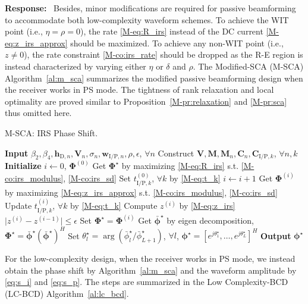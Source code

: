 \documentclass{article}
\newcounter{reviewer}
\newcounter{point}[reviewer]
\newcounter{response}[reviewer]
\newenvironment{response}
	{\refstepcounter{response} \medskip \noindent \textbf{Response:}\ }
	{\medskip}
\begin{document}
\begin{reviewer}
\begin{response}
			Besides, minor modifications are required for passive beamforming to accommodate both low-complexity waveform schemes. To achieve the WIT point (i.e., $\eta=\rho=0$), the rate \eqref{M-eq:R_irs} instead of the DC current \eqref{M-eq:z_irs_approx} should be maximized. To achieve any non-WIT point (i.e., $z \ne 0$), the rate constraint \eqref{M-co:irs_rate} should be dropped as the R-E region is instead characterized by varying either $\eta$ or $\delta$ and $\rho$. The Modified-SCA (M-SCA) Algorithm~\ref{al:m_sca} summarizes the modified passive beamforming design when the receiver works in PS mode. The tightness of rank relaxation and local optimality are proved similar to Proposition~\ref{M-pr:relaxation} and \ref{M-pr:sca} thus omitted here.
			\begin{algorithm}[!h]
				\caption{M-SCA: IRS Phase Shift.}
				\label{al:m_sca}
				\begin{algorithmic}[1]
					\State \textbf{Input} $\beta_2,\beta_4,\boldsymbol{h}_{\mathrm{D},n},\boldsymbol{V}_{n},\sigma_n,\boldsymbol{w}_{\mathrm{I/P},n},\rho,\epsilon$, $\forall n$
					\State Construct $\boldsymbol{V},\boldsymbol{M},\boldsymbol{M}_n,\boldsymbol{C}_{n},\boldsymbol{C}_{\mathrm{I/P},k}$, $\forall n,k$
					\State \textbf{Initialize} $i \gets 0$, $\boldsymbol{\Phi}^{(0)}$
						\State Get $\boldsymbol{\Phi}^{\star}$ by maximizing \eqref{M-eq:R_irs} s.t. \eqref{M-co:irs_modulus}, \eqref{M-co:irs_sd}
					\Else
						\State Set $t_{\mathrm{I/P},k}^{(0)}$, $\forall k$ by \eqref{M-eq:t_k}
						\Repeat
							\State $i \gets i + 1$
								\State Get $\boldsymbol{\Phi}^{(i)}$ by maximizing \eqref{M-eq:z_irs_approx} s.t. \eqref{M-co:irs_modulus}, \eqref{M-co:irs_sd}
								\State Update $t_{\mathrm{I/P},k}^{(i)}$, $\forall k$ by \eqref{M-eq:t_k}
								\State Compute $z^{(i)}$ by \eqref{M-eq:z_irs}
						\Until $\lvert z^{(i)}-z^{(i-1)} \rvert \le \epsilon$
						\State Set $\boldsymbol{\Phi}^{\star}=\boldsymbol{\Phi}^{(i)}$
					\EndIf
					\State Get $\bar{\boldsymbol{\phi}}^\star$ by eigen decomposition, $\boldsymbol{\Phi}^{\star}=\bar{\boldsymbol{\phi}}^\star(\bar{\boldsymbol{\phi}}^\star)^H$
					\State Set $\theta_l^\star=\arg(\bar{\phi}_l^\star/\bar{\phi}_{L+1}^\star)$, $\forall l$, $\boldsymbol{\phi}^{\star}=[e^{j\theta_1^\star},\dots,e^{j\theta_L^\star}]^H$
					\State \textbf{Output} $\boldsymbol{\phi}^{\star}$
				\end{algorithmic}
			\end{algorithm}
			For the low-complexity design, when the receiver works in PS mode, we instead obtain the phase shift by Algorithm~\ref{al:m_sca} and the waveform amplitude by \eqref{eq:s_i} and \eqref{eq:s_p}. The steps are summarized in the Low Complexity-BCD (LC-BCD) Algorithm~\ref{al:lc_bcd}.

\end{response}
\end{reviewer}
\end{document}
